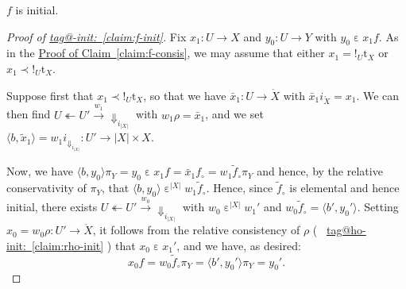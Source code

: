 \documentclass{amsart}
\makeatletter
\newcommand\abs[2][]{#1\lvert{#2}#1\rvert}
\newcommand\br[1]{\langle{}#1\rangle{}}
\newcommand\Dwn{{\Downarrow}}
\newcommand\ein{\mathrel{\varepsilon}}
\newcommand\oot{\twoheadleftarrow}
\newcommand\oring[1]{\mathring{#1}}
\newcommand\rt{\mathrm{t}}
\newcommand\tox[2][]{\xrightarrow[#1]{#2}}
\newcommand\unex{{!}}
\newcommand\tagword[1]{\csname tag@#1\endcsname}
\def\label@tag#1:#2\@nil{#1}
\newcommand\labeltag[1]{\label@tag#1:\@nil}
\newcommand\jref[1]{%
  \texorpdfstring%
    {\hyperref[#1]{\tagword{\labeltag{#1}}~\ref*{#1}}}%
    {\tagword{\labeltag{#1}}~\ref*{#1}}%
}
\theoremstyle{definition}
\theoremstyle{remark}
\theoremstyle{plainwithref}
\makeatother
\begin{document}
\begin{claim} \label{claim:f-init}
  \( f \) is initial.
\end{claim}
\begin{proof}[Proof of \jref{claim:f-init}]
  Fix \( x_1 \colon U \to X \) and \( y_0 \colon U \to Y \) with \( y_0 \ein x_1 f \).
  As in the \hyperref[proof:f-consis]{Proof of Claim~\ref*{claim:f-consis}}, we may assume that either \( x_1 = \unex_U \rt_X \) or \( x_1 \prec \unex_U \rt_X \).

  Suppose first that \( x_1 \prec \unex_U \rt_X \), so that we have \( \bar x_1 \colon U \to \oring X \) with \( \bar x_1 i_{\oring X} = x_1 \).
  We can then find \( U \oot U' \tox{w_1} \Dwn_{i_{\abs X}} \) with \( w_1 \rho = \bar x_1 \), and we set \( \br{b, \tilde x_1} = w_1 i_{\Dwn_{i_{\abs X}}} \colon U' \to \abs{X} \times X \).

  Now, we have \( \br{b, y_0} \pi_Y = y_0 \ein x_1 f = \bar x_1 f_\circ = w_1 \tilde f_\circ \pi_Y \) and hence, by the relative conservativity of \( \pi_Y \), that \( \br{b, y_0} \ein^{\abs X} w_1 \tilde f_\circ \).
  Hence, since \( \tilde f_\circ \) is elemental and hence initial, there exists \( U \oot U' \tox{w_0} \Dwn_{i_{\abs X}} \) with \( w_0 \ein^{\abs X} w_1' \) and \( w_0 \tilde f_\circ = \br{b', y_0'} \).
  Setting \( x_0 = w_0 \rho \colon U' \to \oring X \), it follows from the relative consistency of \( \rho \) (~\jref{claim:rho-init}) that \( x_0 \ein x_1' \), and we have, as desired:
  \[
    x_0 f = w_0 \tilde f_\circ \pi_Y = \br{b', y_0'} \pi_Y = y_0'.
  \]


\end{proof}
\end{document}
